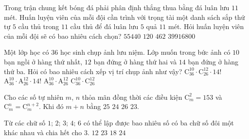 \begin{ex}%
	Trong trận chung kết bóng đá phải phân định thắng thua bằng đá luân lưu $11$ mét. Huấn luyện viên của mỗi đội cần trình với trọng tài một danh sách sắp thứ tự $5$ cầu thủ trong $11$ cầu thủ để đá luân lưu $5$ quả $11$ mét. Hỏi huấn luyện viên của mỗi đội sẽ có bao nhiêu cách chọn?
	\choice
	{\True $55440$}
	{ $120$}
	{ $462$}
	{ $39916800$}
\end{ex}
\begin{ex}%
	Một lớp học có $36$ học sinh chụp ảnh lưu niệm. Lớp muốn trong bức ảnh có $10$ bạn ngồi ở hàng thứ nhất, $12$ bạn đứng ở hàng thứ hai và $14$ bạn đứng ở hàng thứ ba. Hỏi có bao nhiêu cách xếp vị trí chụp ảnh như vậy?
	\choice
	{$\mathrm{C}_{36}^{10}\cdot\mathrm{C}_{26}^{12}\cdot14!$}
	{\True $\mathrm{A}_{36}^{10}\cdot\mathrm{A}_{26}^{12}\cdot14!$}
	{ $\mathrm{A}_{36}^{10}\cdot\mathrm{A}_{26}^{12}$}
	{ $\mathrm{C}_{36}^{10}\cdot\mathrm{C}_{26}^{12}$}
\end{ex}
\begin{ex}%
	Cho các số tự nhiên $m$, $n$ thỏa mãn đồng thời các điều kiện $\mathrm{C}_m^2=153$ và $\mathrm{C}_m^n=\mathrm{C}_m^{n+2}$. Khi đó $m+n$ bằng
	\choice
	{ $25$}
	{ $24$}
	{\True $26$}
	{ $23$.
	}
\end{ex}
\begin{ex}%
	Từ các chữ số $\text{1; 2; 3; 4; 6}$ có thể lập được bao nhiêu số có ba chữ số đôi một khác nhau và chia hết cho $3$.
	\choice
	{ $12$}
	{ $23$}
	{ $18$}
	{\True $24$}
\end{ex}
